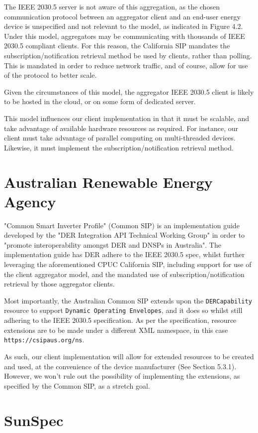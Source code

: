 The IEEE 2030.5 server is not aware of this aggregation, as the chosen communication protocol between an aggregator client and an end-user energy device is unspecified and not relevant to the model, as indicated in Figure 4.2.
Under this model, aggregators may be communicating with thousands of IEEE 2030.5 compliant clients. For this reason, the California SIP mandates the subscription/notification retrieval method be used by clients, rather than polling.
This is mandated in order to reduce network traffic, and of course, allow for use of the protocol to better scale.

Given the circumstances of this model, the aggregator IEEE 2030.5 client is likely to be hosted in the cloud, or on some form of dedicated server.

This model influences our client implementation in that it must be scalable, and take advantage of available hardware resources as required. For instance, our client must take advantage of parallel computing on multi-threaded devices.
Likewise, it must implement the subscription/notification retrieval method.


\section{Australian Renewable Energy Agency}
"Common Smart Inverter Profile" (Common SIP) is an implementation guide developed by the "DER Integration API Technical Working Group" in order to "promote interoperability amongst DER and DNSPs in Australia".
The implementation guide has DER adhere to the IEEE 2030.5 spec, whilst further leveraging the aforementioned CPUC California SIP, including support for use of the client aggregator model, and the mandated use of subscription/notification retrieval by those aggregator clients.

Most importantly, the Australian Common SIP extends upon the \texttt{DERCapability} resource to support \texttt{Dynamic Operating Envelopes}, and it does so whilst still adhering to the IEEE 2030.5 specification.
As per the specification, resource extensions are to be made under a different XML namespace, in this case \texttt{https://csipaus.org/ns}. \cite[]{CSIPAus}

As such, our client implementation will allow for extended resources to be created and used, at the convenience of the device manufacturer (See Section 5.3.1). 
However, we won't rule out the possibility of implementing the extensions, as specified by the Common SIP, as a stretch goal. 
\section{SunSpec}


